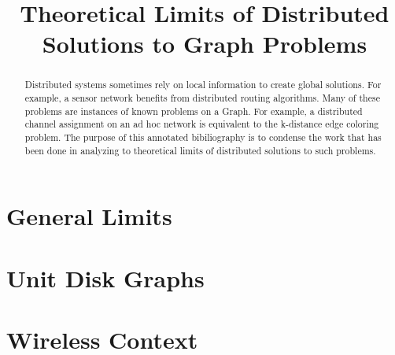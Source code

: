 \documentclass[conference, 11pt]{IEEEtran}
\theoremstyle{definition}
\begin{document}




\title{Theoretical Limits of Distributed Solutions to Graph Problems} 

\author{
}

\maketitle

\begin{abstract}
Distributed systems sometimes rely on local information to create global solutions. For example, a sensor network benefits from  distributed routing algorithms. Many of these problems are instances of known problems on a Graph. For example, a distributed channel assignment on an ad hoc network is equivalent to the k-distance edge coloring problem. The purpose of this annotated bibiliography is to condense the work that has been done in analyzing to theoretical limits of distributed solutions to such problems.
\end{abstract}

\section{General Limits}
\nocite{1011811}\nocite{1398717}\nocite{1378540}\nocite{1146387}
\putbib
\section{Unit Disk Graphs}
\nocite{1073826}
\putbib
\section{Wireless Context}
\nocite{978-3-540-77220-0_36}\nocite{1542768}
\putbib
\end{document}
